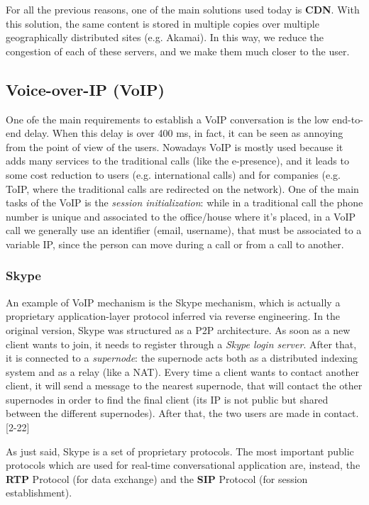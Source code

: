 \noindent For all the previous reasons, one of the main solutions used today is \textbf{CDN}. With this solution, the same content is stored in multiple copies over multiple geographically distributed sites (e.g. Akamai). In this way, we reduce the congestion of each of these servers, and we make them much closer to the user.

\subsection{Voice-over-IP (VoIP)}
One ofe the main requirements to establish a VoIP conversation is the low end-to-end delay. When this delay is over 400 ms, in fact, it can be seen as annoying from the point of view of the users. Nowadays VoIP is mostly used because it adds many services to the traditional calls (like the e-presence), and it leads to some cost reduction to users (e.g. international calls) and for companies (e.g. ToIP, where the traditional calls are redirected on the network). One of the main tasks of the VoIP is the \textit{session initialization}: while in a traditional call the phone number is unique and associated to the office/house where it's placed, in a VoIP call we generally use an identifier (email, username), that must be associated to a variable IP, since the person can move during a call or from a call to another.

\subsubsection{Skype}
An example of VoIP mechanism is the Skype mechanism, which is actually a proprietary application-layer protocol inferred via reverse engineering. In the original version, Skype was structured as a P2P architecture. As soon as a new client wants to join, it needs to register through a \textit{Skype login server}. After that, it is connected to a \textit{supernode}: the supernode acts both as a distributed indexing system and as a relay (like a NAT). Every time a client wants to contact another client, it will send a message to the nearest supernode, that will contact the other supernodes in order to find the final client (its IP is not public but shared between the different supernodes). After that, the two users are made in contact. [2-22]

As just said, Skype is a set of proprietary protocols. The most important public protocols which are used for real-time conversational application are, instead, the \textbf{RTP} Protocol (for data exchange) and the \textbf{SIP} Protocol (for session establishment).

